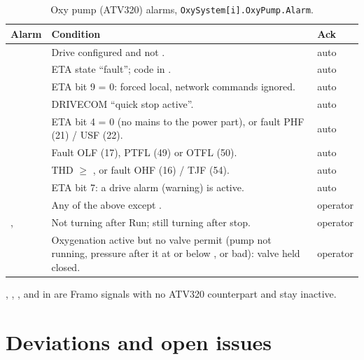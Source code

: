 \documentclass[11pt]{article}
\begin{document}
\begin{table}[htbp]
\centering\small
\caption{Oxy pump (ATV320) alarms, \texttt{OxySystem[i].OxyPump.Alarm}.}
\label{tab:oxyalarms}
\begin{tabularx}{\textwidth}{@{}P{42mm}L P{18mm}@{}}
\toprule
Alarm & Condition & Ack \\
\midrule
{} & Drive configured and  not . & auto \\
 & ETA state ``fault''; code in . & auto \\
 & ETA bit 9 = 0: forced local, network commands ignored. & auto \\
 & DRIVECOM ``quick stop active''. & auto \\
 & ETA bit 4 = 0 (no mains to the power part), or fault PHF (21) / USF (22). & auto \\
 & Fault OLF (17), PTFL (49) or OTFL (50). & auto \\
 & THD $\geq$ , or fault OHF (16) / TJF (54). & auto \\
 & ETA bit 7: a drive alarm (warning) is active. & auto \\
 & Any of the above except . & operator \\
,  & Not turning  after Run; still turning  after stop. & operator \\
 & Oxygenation active but no valve permit (pump not running, pressure after it at or below , or bad): valve held closed. & operator \\
\bottomrule
\end{tabularx}
\end{table}

, , ,  and 
in  are Framo signals with no ATV320 counterpart and stay inactive.

\section{Deviations and open issues}
\label{sec:dev}
\end{document}
